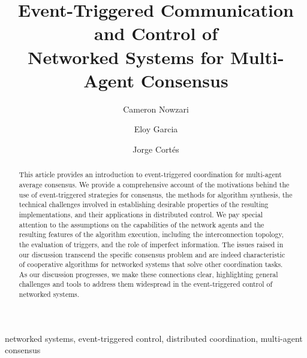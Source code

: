 \documentclass{autart}
\begin{document}
\clearpage


\begin{frontmatter}
  
  \title{Event-Triggered Communication and Control of
    \\
    {Networked} Systems for Multi-Agent Consensus}
  
  \author[address]{Cameron Nowzari} \qquad
  \author[address2]{Eloy Garcia}  \qquad
  \author[address3]{Jorge Cort\'es} 
  
  \address[address]{Department of Electrical and Computer Engineering,
    George Mason University, Fairfax, VA, 22030, USA}
  \address[address2]{Control Science Center of Excellence, Air Force
    Research Laboratory, Wright-Patterson AFB, OH, 45433, USA}
  \address[address3]{Department of Mechanical and Aerospace
    Engineering, University of California, San Diego, CA, 92093, USA}

  \begin{abstract}
    This article provides an introduction to event-triggered coordination for
    multi-agent average consensus. We provide a comprehensive account
    of the motivations behind the use of event-triggered strategies
    for consensus, the methods for algorithm synthesis, the technical
    challenges involved in establishing desirable properties of the
    resulting implementations, and their applications in distributed
    control.  We pay special attention to the assumptions on the
    capabilities of the network agents and the resulting features of the
    algorithm execution, including the interconnection topology, the
    evaluation of triggers, and the role of imperfect information.
    The issues raised in our discussion transcend the specific
    consensus problem and are indeed characteristic of cooperative
    algorithms for networked systems that solve other
    coordination tasks. As our discussion progresses, we make these
    connections clear, highlighting general challenges and tools to
    address them widespread in the event-triggered control of {networked}
    systems.
  \end{abstract}

  \begin{keyword}
    networked systems, event-triggered control,
    distributed coordination, multi-agent consensus
  \end{keyword}
  
\end{frontmatter}
\end{document}
